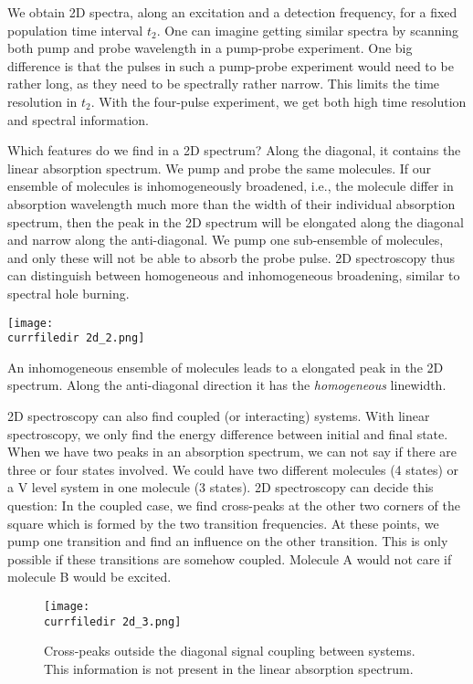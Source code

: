 We obtain 2D spectra, along an excitation and a detection frequency, for a fixed population time interval $t_2$. One can imagine getting similar spectra by scanning both pump and probe wavelength in a pump-probe experiment. One big difference is that the pulses in such a pump-probe experiment would need to be rather long, as they need to be spectrally rather narrow. This limits the time resolution in $t_2$. With the four-pulse experiment, we get both high time resolution and spectral information.

Which features do we find in a 2D spectrum? Along the diagonal, it contains the linear absorption spectrum. We pump and probe the same molecules. If our ensemble of molecules is inhomogeneously broadened, i.e., the molecule differ in absorption wavelength much more than the width of their individual absorption spectrum, then the peak in the 2D spectrum will be elongated along the diagonal and narrow along the anti-diagonal. We pump one sub-ensemble of molecules, and only these will not be able to absorb the probe pulse. 2D spectroscopy thus can distinguish between homogeneous and inhomogeneous broadening, similar to spectral hole burning.


\begin{marginfigure}
\texttt{[image: \\currfiledir 2d\_2.png]}
\caption{An inhomogeneous ensemble of molecules leads to a elongated peak in the 2D spectrum. Along the anti-diagonal direction it has the \emph{homogeneous} linewidth.}
\label{fig_2d_inhom}
\end{marginfigure}



2D spectroscopy can also find coupled (or interacting) systems. With linear spectroscopy, we only find the energy difference between initial and final state. When we have two peaks in an absorption spectrum, we can not say if there are three or four states involved. We could have two  different molecules (4 states) or a V level system in one molecule (3 states). 2D spectroscopy can decide this question: In the coupled case, we find cross-peaks at the  other two corners  of the square which is formed by the two transition frequencies. At these points, we pump one transition and find an influence on the other transition. This is only possible if these transitions are somehow coupled. Molecule A would not care if molecule B would be excited.

\begin{figure}
\texttt{[image: \\currfiledir 2d\_3.png]}
\caption{Cross-peaks outside the diagonal signal coupling between systems. This information is not present in the linear absorption spectrum.}
\label{fig_2d_crosspeak}
\end{figure}


